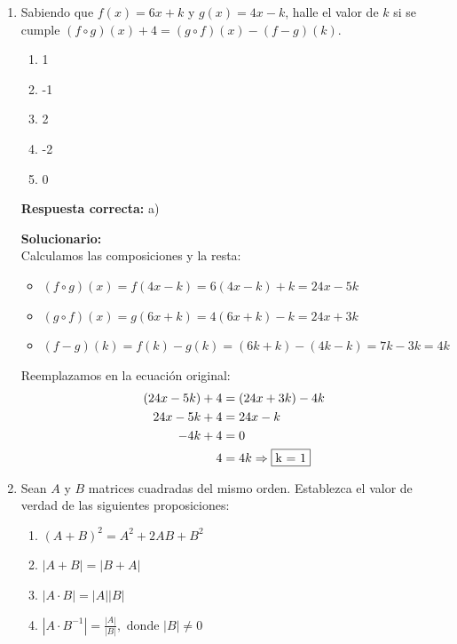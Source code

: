 \begin{enumerate}
	
	
	\item Sabiendo que $f(x) = 6x + k$ y $g(x) = 4x - k$, halle el valor de $k$ si se cumple $(f \circ g)(x) + 4 = (g \circ f)(x) - (f - g)(k)$.
	
	\begin{enumerate}[label=\alph*)]
		\item 1
		\item -1
		\item 2
		\item -2
		\item 0
	\end{enumerate}
	
	\textbf{Respuesta correcta:} a)
	
	\vspace{2mm}
	\textbf{Solucionario:}\\
	Calculamos las composiciones y la resta:
	\begin{itemize}
		\item $(f \circ g)(x) = f(4x - k) = 6(4x - k) + k = 24x - 5k$
		\item $(g \circ f)(x) = g(6x + k) = 4(6x + k) - k = 24x + 3k$
		\item $(f - g)(k) = f(k) - g(k) = (6k + k) - (4k - k) = 7k - 3k = 4k$
	\end{itemize}
	Reemplazamos en la ecuación original:
	\begin{align*}
		(24x - 5k) + 4 &= (24x + 3k) - 4k \\
		24x - 5k + 4 &= 24x - k \\
		-4k + 4 &= 0 \\
		4 &= 4k \Rightarrow \fbox{k = 1}
	\end{align*}
	
	
	
	
	
	\vspace{6mm}
	
	
	
	
	\item Sean $A$ y $B$ matrices cuadradas del mismo orden. Establezca el valor de verdad de las siguientes proposiciones:
	\begin{enumerate}[label=\Roman*.]
		\item $(A + B)^2 = A^2 + 2AB + B^2$
		\item $|A + B| = |B + A|$
		\item $|A \cdot B| = |A| |B|$
		\item $|A \cdot B^{-1}| =\displaystyle \frac{|A|}{|B|}, \text{ donde } |B| \neq 0$
	\end{enumerate}
	

\end{enumerate}

